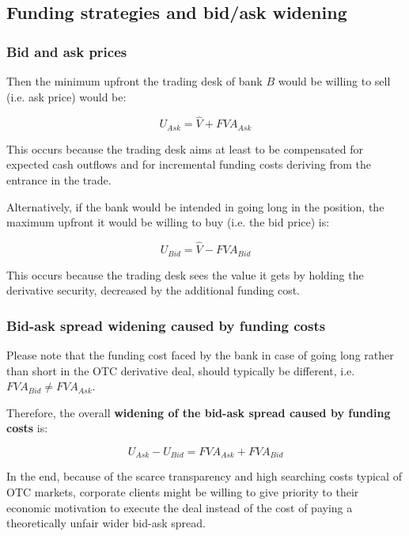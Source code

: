 \documentclass{beamer}
\begin{document}
\subsection{Funding strategies and bid/ask widening}


\begin{frame}
\frametitle{Bid and ask prices}
	Then the minimum upfront the trading desk of bank $B$ would be willing to sell (i.e. ask price) would be:

	\begin{equation}
		U_{Ask} = \hat{V} + FVA_{Ask}
	\end{equation}

	This occurs because the trading desk aims at least to be compensated for expected cash outflows and for incremental funding costs deriving from the entrance in the trade.

	Alternatively, if the bank would be intended in going long in the position, the maximum upfront it would be willing to buy (i.e. the bid price) is:

	\begin{equation}
		U_{Bid} = \hat{V}-FVA_{Bid}
	\end{equation}

	This occurs because the trading desk sees the value it gets by holding the derivative security, decreased by the additional funding cost. 
\end{frame}

\begin{frame}
\frametitle{Bid-ask spread widening caused by funding costs}

	Please note that the funding cost faced by the bank in case of going long rather than short in the OTC derivative deal, should typically be different, i.e. $FVA_{Bid} \not= FVA_{Ask}$. 

	Therefore, the overall \textbf{widening of the bid-ask spread caused by funding costs} is:

	\begin{equation}\label{bid-ask}
		U_{Ask}-U_{Bid} = FVA_{Ask} + FVA_{Bid}
	\end{equation}

	In the end, because of the scarce transparency and high searching costs typical of OTC markets, corporate clients might be willing to give priority to their economic motivation to execute the deal instead of the cost of paying a theoretically unfair wider bid-ask spread.
\end{frame}
\end{document}

